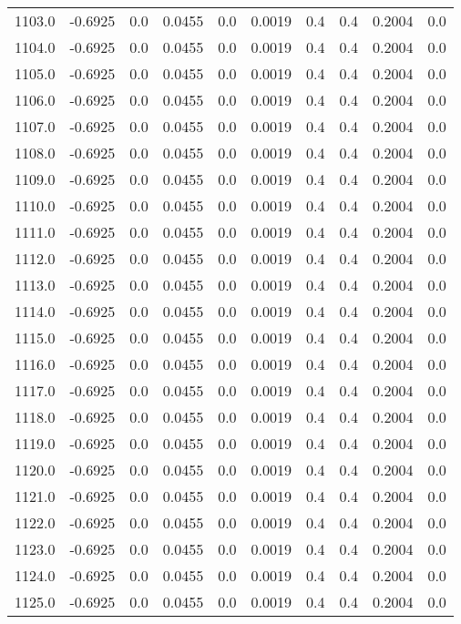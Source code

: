 \begin{longtable}{lrrrrrrrrr}
1103.0 & -0.6925 & 0.0 & 0.0455 & 0.0 & 0.0019 & 0.4 & 0.4 & 0.2004 & 0.0 \\
1104.0 & -0.6925 & 0.0 & 0.0455 & 0.0 & 0.0019 & 0.4 & 0.4 & 0.2004 & 0.0 \\
1105.0 & -0.6925 & 0.0 & 0.0455 & 0.0 & 0.0019 & 0.4 & 0.4 & 0.2004 & 0.0 \\
1106.0 & -0.6925 & 0.0 & 0.0455 & 0.0 & 0.0019 & 0.4 & 0.4 & 0.2004 & 0.0 \\
1107.0 & -0.6925 & 0.0 & 0.0455 & 0.0 & 0.0019 & 0.4 & 0.4 & 0.2004 & 0.0 \\
1108.0 & -0.6925 & 0.0 & 0.0455 & 0.0 & 0.0019 & 0.4 & 0.4 & 0.2004 & 0.0 \\
1109.0 & -0.6925 & 0.0 & 0.0455 & 0.0 & 0.0019 & 0.4 & 0.4 & 0.2004 & 0.0 \\
1110.0 & -0.6925 & 0.0 & 0.0455 & 0.0 & 0.0019 & 0.4 & 0.4 & 0.2004 & 0.0 \\
1111.0 & -0.6925 & 0.0 & 0.0455 & 0.0 & 0.0019 & 0.4 & 0.4 & 0.2004 & 0.0 \\
1112.0 & -0.6925 & 0.0 & 0.0455 & 0.0 & 0.0019 & 0.4 & 0.4 & 0.2004 & 0.0 \\
1113.0 & -0.6925 & 0.0 & 0.0455 & 0.0 & 0.0019 & 0.4 & 0.4 & 0.2004 & 0.0 \\
1114.0 & -0.6925 & 0.0 & 0.0455 & 0.0 & 0.0019 & 0.4 & 0.4 & 0.2004 & 0.0 \\
1115.0 & -0.6925 & 0.0 & 0.0455 & 0.0 & 0.0019 & 0.4 & 0.4 & 0.2004 & 0.0 \\
1116.0 & -0.6925 & 0.0 & 0.0455 & 0.0 & 0.0019 & 0.4 & 0.4 & 0.2004 & 0.0 \\
1117.0 & -0.6925 & 0.0 & 0.0455 & 0.0 & 0.0019 & 0.4 & 0.4 & 0.2004 & 0.0 \\
1118.0 & -0.6925 & 0.0 & 0.0455 & 0.0 & 0.0019 & 0.4 & 0.4 & 0.2004 & 0.0 \\
1119.0 & -0.6925 & 0.0 & 0.0455 & 0.0 & 0.0019 & 0.4 & 0.4 & 0.2004 & 0.0 \\
1120.0 & -0.6925 & 0.0 & 0.0455 & 0.0 & 0.0019 & 0.4 & 0.4 & 0.2004 & 0.0 \\
1121.0 & -0.6925 & 0.0 & 0.0455 & 0.0 & 0.0019 & 0.4 & 0.4 & 0.2004 & 0.0 \\
1122.0 & -0.6925 & 0.0 & 0.0455 & 0.0 & 0.0019 & 0.4 & 0.4 & 0.2004 & 0.0 \\
1123.0 & -0.6925 & 0.0 & 0.0455 & 0.0 & 0.0019 & 0.4 & 0.4 & 0.2004 & 0.0 \\
1124.0 & -0.6925 & 0.0 & 0.0455 & 0.0 & 0.0019 & 0.4 & 0.4 & 0.2004 & 0.0 \\
1125.0 & -0.6925 & 0.0 & 0.0455 & 0.0 & 0.0019 & 0.4 & 0.4 & 0.2004 & 0.0 \\

\end{longtable}
